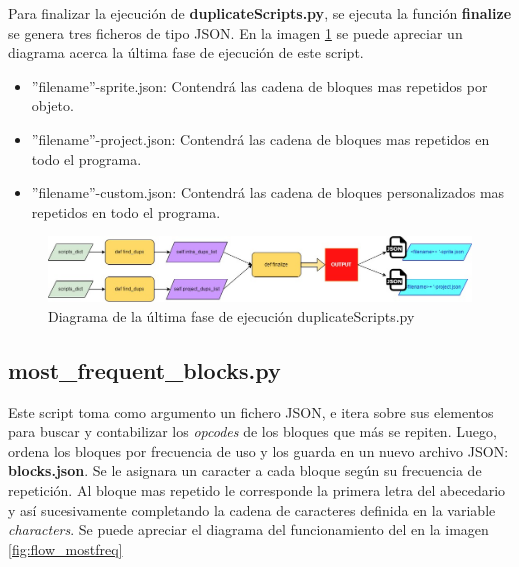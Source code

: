 \documentclass[a4paper, 12pt]{book}
\begin{document}
Para finalizar la ejecución de \textbf{duplicateScripts.py}, se ejecuta la función \textbf{finalize} se genera tres ficheros de tipo JSON. En la imagen \ref{fig:flow_finddups} se puede apreciar un diagrama acerca la última fase de ejecución de este script.

\begin{itemize}
\item ''filename''-sprite.json: Contendrá las cadena de bloques mas repetidos por objeto.
\item ''filename''-project.json: Contendrá las cadena de bloques mas repetidos en todo el programa.
\item ''filename''-custom.json: Contendrá las cadena de bloques personalizados mas repetidos en todo el programa.
\end{itemize}

\begin{figure}[!htb]
  \centering
  \includegraphics[width=15cm, keepaspectratio]{img/flow_finddups.jpg}
  \caption{Diagrama de la última fase de ejecución duplicateScripts.py}
  \label{fig:flow_finddups}
\end{figure}

\subsection{most\_frequent\_blocks.py}

Este script toma como argumento un fichero JSON, e itera sobre sus elementos para buscar y contabilizar los \textit{opcodes} de los bloques que más se repiten. Luego, ordena los bloques por frecuencia de uso y los guarda en un nuevo archivo JSON: \textbf{blocks.json}. Se le asignara un caracter a cada bloque según su frecuencia de repetición. Al bloque mas repetido le corresponde la primera letra del abecedario y así sucesivamente completando la cadena de caracteres definida en la variable \textit{characters}. Se puede apreciar el diagrama del funcionamiento del   en la imagen \ref{fig:flow_mostfreq}


\end{document}
